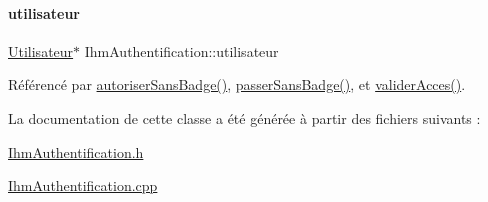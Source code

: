 \mbox{\label{class_ihm_authentification_ad08cee96c59182c27198907491f0c963}} 
\paragraph{\texorpdfstring{utilisateur}{utilisateur}}
{\footnotesize\ttfamily \hyperlink{class_utilisateur}{Utilisateur}$\ast$ Ihm\+Authentification\+::utilisateur\hspace{0.3cm}{\ttfamily [private]}}



Référencé par \hyperlink{class_ihm_authentification_add8f8e7a0fbf70cef9399ba9f7db7b7e}{autoriser\+Sans\+Badge()}, \hyperlink{class_ihm_authentification_a6a67fe1c8e354a9ad123d8c53c16c6c4}{passer\+Sans\+Badge()}, et \hyperlink{class_ihm_authentification_ad62f646310fff597d3bf50af2c3d5d0c}{valider\+Acces()}.



La documentation de cette classe a été générée à partir des fichiers suivants \+:\begin{DoxyCompactItemize}
\item 
\hyperlink{_ihm_authentification_8h}{Ihm\+Authentification.\+h}\item 
\hyperlink{_ihm_authentification_8cpp}{Ihm\+Authentification.\+cpp}\end{DoxyCompactItemize}
